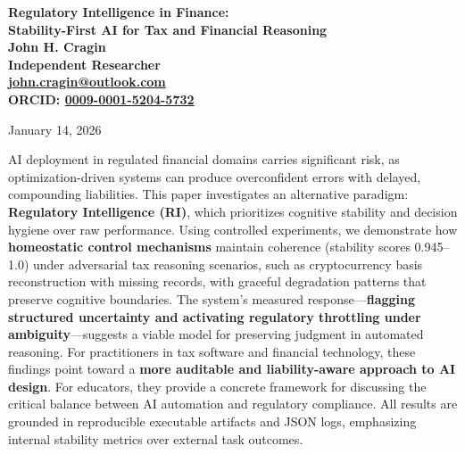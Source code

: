 \documentclass[12pt,a4paper]{article}
\renewenvironment{abstract}{
    \begin{center}
        {\large\bfseries \abstractname\vspace{-.5em}\vspace{0pt}}
    \end{center}
}{}
\begin{document}
\begin{titlepage}
  \vspace*{\fill}
  \begin{center}
    \Huge\bfseries Regulatory Intelligence in Finance: \\
    \large Stability-First AI for Tax and Financial Reasoning \\[2em]
    
    \large John H. Cragin \\[0.5em]
    \normalsize Independent Researcher \\[0.2em]
    \normalsize \href{mailto:john.cragin@outlook.com}{john.cragin@outlook.com} \\[1em]
    ORCID: \href{https://orcid.org/0009-0001-5204-5732}{0009-0001-5204-5732}

    \normalsize January 14, 2026
  \end{center}
  \vspace*{\fill}
\end{titlepage}

\begin{abstract}
AI deployment in regulated financial domains carries significant risk, as optimization-driven systems can produce overconfident errors with delayed, compounding liabilities. This paper investigates an alternative paradigm: \textbf{Regulatory Intelligence (RI)}, which prioritizes cognitive stability and decision hygiene over raw performance. Using controlled experiments, we demonstrate how \textbf{homeostatic control mechanisms} maintain coherence (stability scores 0.945–1.0) under adversarial tax reasoning scenarios, such as cryptocurrency basis reconstruction with missing records, with graceful degradation patterns that preserve cognitive boundaries. The system's measured response—\textbf{flagging structured uncertainty and activating regulatory throttling under ambiguity}—suggests a viable model for preserving judgment in automated reasoning. For practitioners in tax software and financial technology, these findings point toward a \textbf{more auditable and liability-aware approach to AI design}. For educators, they provide a concrete framework for discussing the critical balance between AI automation and regulatory compliance. All results are grounded in reproducible executable artifacts and JSON logs, emphasizing internal stability metrics over external task outcomes.
\end{abstract}
\end{document}
